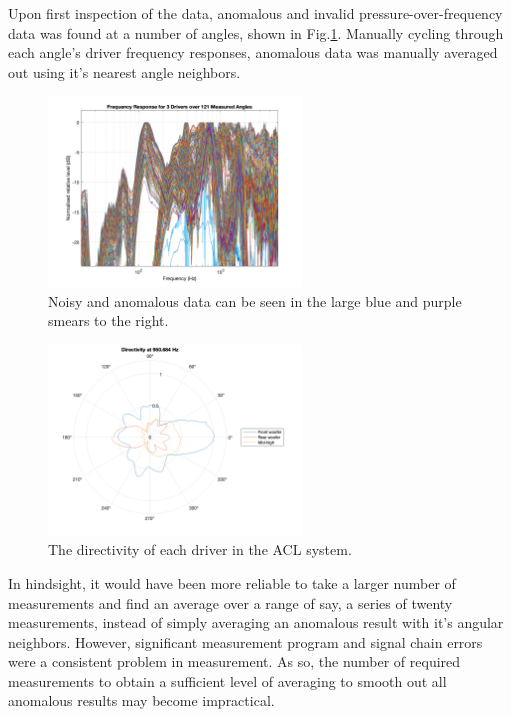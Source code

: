 \documentclass{report}
\begin{document}
        Upon first inspection of the data, anomalous and invalid pressure-over-frequency data was found at a number of angles, shown in Fig.\ref{allAngles}.
        Manually cycling through each angle's driver frequency responses, anomalous data was manually averaged out using it's nearest angle neighbors.

        \begin{figure}[H]
            \centering
            \includegraphics[width = 0.6\textwidth]{figs/allAngles.png}%
            \caption{Noisy and anomalous data can be seen in the large blue and purple smears to the right.}
            \label{allAngles}
        \end{figure}
        
        \begin{figure}[H]
            \centering
            \hspace{2cm} \includegraphics[width = 0.6\textwidth]{figs/initialDirectivity.png}
            \caption{The directivity of each driver in the ACL system.}
            \label{initialDirectivity}
        \end{figure}
        \newpage

        In hindsight, it would have been more reliable to take a larger number of measurements and find an average over a range of say, a series of twenty measurements, instead of simply averaging an anomalous result with it's angular neighbors.
        However, significant measurement program and signal chain errors were a consistent problem in measurement.
        As so, the number of required measurements to obtain a sufficient level of averaging to smooth out all anomalous results may become impractical.
\end{document}

